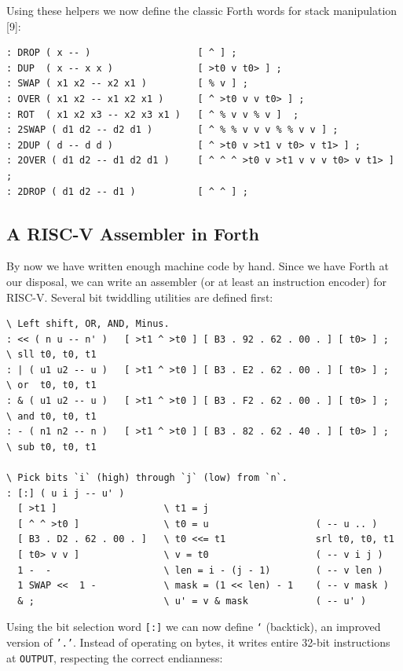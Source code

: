 \documentclass[a4paper,12pt,final]{article}
\makeatletter
\newcommand{\citeprocitem}[2]{\hyper@linkstart{cite}{citeproc_bib_item_#1}#2\hyper@linkend}
\makeatother
\begin{document}
Using these helpers we now define the classic Forth words for stack
manipulation \citeprocitem{9}{[9]}:

\fontsize{9pt}{9.000000pt}\selectfont
\begin{verbatim}
: DROP ( x -- )                   [ ^ ] ;
: DUP  ( x -- x x )               [ >t0 v t0> ] ;
: SWAP ( x1 x2 -- x2 x1 )         [ % v ] ;
: OVER ( x1 x2 -- x1 x2 x1 )      [ ^ >t0 v v t0> ] ;
: ROT  ( x1 x2 x3 -- x2 x3 x1 )   [ ^ % v v % v ]  ;
: 2SWAP ( d1 d2 -- d2 d1 )        [ ^ % % v v v % % v v ] ;
: 2DUP ( d -- d d )               [ ^ >t0 v >t1 v t0> v t1> ] ;
: 2OVER ( d1 d2 -- d1 d2 d1 )     [ ^ ^ ^ >t0 v >t1 v v v t0> v t1> ] ;
: 2DROP ( d1 d2 -- d1 )           [ ^ ^ ] ;
\end{verbatim}
\normalsize


\subsection{A RISC-V Assembler in Forth}
\label{sec:orga98b7ef}

By now we have written enough machine code by hand.  Since we have
Forth at our disposal, we can write an assembler (or at least an
instruction encoder) for RISC-V.  Several bit twiddling utilities are
defined first:

\fontsize{9pt}{9.000000pt}\selectfont
\begin{verbatim}
\ Left shift, OR, AND, Minus.
: << ( n u -- n' )   [ >t1 ^ >t0 ] [ B3 . 92 . 62 . 00 . ] [ t0> ] ;        \ sll t0, t0, t1
: | ( u1 u2 -- u )   [ >t1 ^ >t0 ] [ B3 . E2 . 62 . 00 . ] [ t0> ] ;        \ or  t0, t0, t1
: & ( u1 u2 -- u )   [ >t1 ^ >t0 ] [ B3 . F2 . 62 . 00 . ] [ t0> ] ;        \ and t0, t0, t1
: - ( n1 n2 -- n )   [ >t1 ^ >t0 ] [ B3 . 82 . 62 . 40 . ] [ t0> ] ;        \ sub t0, t0, t1

\ Pick bits `i` (high) through `j` (low) from `n`.
: [:] ( u i j -- u' )
  [ >t1 ]                   \ t1 = j
  [ ^ ^ >t0 ]               \ t0 = u                   ( -- u .. )
  [ B3 . D2 . 62 . 00 . ]   \ t0 <<= t1                srl t0, t0, t1
  [ t0> v v ]               \ v = t0                   ( -- v i j )
  1 -  -                    \ len = i - (j - 1)        ( -- v len )
  1 SWAP <<  1 -            \ mask = (1 << len) - 1    ( -- v mask )
  & ;                       \ u' = v & mask            ( -- u' )
\end{verbatim}
\normalsize

Using the bit selection word \texttt{[:]} we can now define \texttt{`} (backtick),
an improved version of \texttt{'.'}​.  Instead of operating on bytes, it
writes entire 32-bit instructions at \texttt{OUTPUT}, respecting the correct
endianness:
\end{document}
